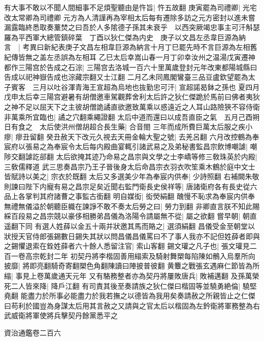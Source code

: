 有大事不敢以不聞人間細事不足煩聖聽由是忤旨|{
	忤五故翻}
庚寅罷為司禮卿|{
	光宅改太常卿為司禮卿}
元方為人清謹再為宰相太后每有遷除多訪之元方密封以進未嘗漏露臨終悉取奏藳焚之曰吾於人多隂德子孫其未衰乎　以西突厥竭忠事主可汗斛瑟羅為平西軍大總管鎮碎葉　丁酉以狄仁傑為内史　庚子以文昌左丞韋巨源為納言　|{
	考異曰新紀表庚子文昌左相韋巨源為納言十月丁巳罷先時不言巨源為左相舊紀傳皆無之盖左丞誤為左相耳}
乙巳太后幸嵩山春一月丁卯幸汝州之温湯戊寅遷神都作三陽宫於告成之石淙|{
	三陽宫去洛城一百六十里萬歲登封元年改東都陽城縣曰告成以祀神嶽告成也淙藏宗翻又士江翻}
二月乙未同鳳閣鸞臺三品豆盧欽望罷為太子賓客　三月以吐谷渾青海王宣超為烏地也抜勤忠可汗|{
	宣超諾曷鉢之孫也}
夏四月戊申太后幸三陽宫避暑有胡僧邀車駕觀葬舍利太后許之狄仁傑跪於馬前曰佛者夷狄之神不足以屈天下之主彼胡僧詭譎直欲邀致萬乘以惑遠近之人耳山路險狹不容侍衛非萬乘所宜臨也|{
	譎之穴翻乘繩證翻}
太后中道而還曰以成吾直臣之氣　五月己酉朔日有食之　太后使洪州僧胡超合長生藥|{
	合音閤}
三年而成所費巨萬太后服之疾小瘳|{
	瘳丑留翻}
癸丑赦天下改元久視去天冊金輪大聖之號|{
	去羌呂翻}
六月改控鶴為奉宸府以張易之為奉宸令太后每内殿曲宴輒引諸武易之及弟秘書監昌宗飲博嘲謔|{
	嘲陟交翻謔訖郤翻}
太后欲掩其迹乃命易之昌宗與文學之士李嶠等修三敎珠英於内殿|{
	三敎儒釋道}
武三思奏昌宗乃王子晉後身太后命昌宗衣羽衣吹笙乘木鶴於庭中文士皆賦詩以美之|{
	宗衣於既翻}
太后又多選美少年為奉宸内供奉|{
	少詩照翻}
右補闕朱敬則諫曰陛下内寵有易之昌宗足矣近聞右監門衛長史侯祥等|{
	唐諸衛府各有長史從六品上各掌判其府諸曹之事監古銜翻}
明自媒衒|{
	衒熒絹翻}
醜慢不恥求為奉宸内供奉無禮無儀溢於朝聽臣軄在諫諍不敢不奏太后勞之曰|{
	勞力到翻}
非卿直言朕不知此賜綵百段易之昌宗競以豪侈相勝弟昌儀為洛陽令請屬無不從|{
	屬之欲翻}
嘗早朝|{
	朝直遥翻下同}
有選人姓薛以金五十兩并狀邀其馬而賂之|{
	選須絹翻}
昌儀受金至朝堂以狀授天官侍郎張錫數日錫失其狀以問昌儀昌儀罵曰不了事人我亦不記但姓薛者即與之錫懼退索在銓姓薛者六十餘人悉留注官|{
	索山客翻}
錫文瓘之凡子也|{
	張文瓘見二百一卷高宗乾封二年}
初契丹將李楷固善用䌈索及騎射舞槊每陷陳如鶻入烏羣所向披靡|{
	將即亮翻騎奇寄翻槊色角翻陳讀曰陣披普彼翻}
黄麞之戰張玄遇麻仁節皆為所䌈|{
	事見上卷萬歲通天元年}
又有駱務整者亦為契丹將屢敗唐兵|{
	敗補邁翻}
及孫萬榮死二人皆來降|{
	降戶江翻}
有司責其後至奏請族之狄仁傑曰楷固等並驍勇絶倫|{
	驍堅堯翻}
能盡力於所事必能盡力於我若撫之以德皆為我用矣奏請赦之所親皆止之仁傑曰苟利於國豈為身謀太后用其言赦之又請與之官太后以楷固為左鈐衛將軍務整為右武威衛將軍使將兵擊契丹餘黨悉平之

資治通鑑卷二百六
